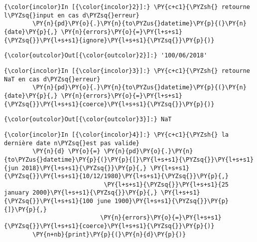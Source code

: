     \begin{Verbatim}[commandchars=\\\{\},frame=single,framerule=0.3mm,rulecolor=\color{cellframecolor}]
{\color{incolor}In [{\color{incolor}2}]:} \PY{c+c1}{\PYZsh{} retourne l\PYZsq{}input en cas d\PYZsq{}erreur}
        \PY{n}{pd}\PY{o}{.}\PY{n}{to\PYZus{}datetime}\PY{p}{(}\PY{n}{date}\PY{p}{,} \PY{n}{errors}\PY{o}{=}\PY{l+s+s1}{\PYZsq{}}\PY{l+s+s1}{ignore}\PY{l+s+s1}{\PYZsq{}}\PY{p}{)}
\end{Verbatim}


\begin{Verbatim}[commandchars=\\\{\},frame=single,framerule=0.3mm,rulecolor=\color{cellframecolor}]
{\color{outcolor}Out[{\color{outcolor}2}]:} '100/06/2018'
\end{Verbatim}
            
    \begin{Verbatim}[commandchars=\\\{\},frame=single,framerule=0.3mm,rulecolor=\color{cellframecolor}]
{\color{incolor}In [{\color{incolor}3}]:} \PY{c+c1}{\PYZsh{} retourne NaT en cas d\PYZsq{}erreur}
        \PY{n}{pd}\PY{o}{.}\PY{n}{to\PYZus{}datetime}\PY{p}{(}\PY{n}{date}\PY{p}{,} \PY{n}{errors}\PY{o}{=}\PY{l+s+s1}{\PYZsq{}}\PY{l+s+s1}{coerce}\PY{l+s+s1}{\PYZsq{}}\PY{p}{)}
\end{Verbatim}


\begin{Verbatim}[commandchars=\\\{\},frame=single,framerule=0.3mm,rulecolor=\color{cellframecolor}]
{\color{outcolor}Out[{\color{outcolor}3}]:} NaT
\end{Verbatim}
            
    \begin{Verbatim}[commandchars=\\\{\},frame=single,framerule=0.3mm,rulecolor=\color{cellframecolor}]
{\color{incolor}In [{\color{incolor}4}]:} \PY{c+c1}{\PYZsh{} la dernière date n\PYZsq{}est pas valide}
        \PY{n}{d} \PY{o}{=} \PY{n}{pd}\PY{o}{.}\PY{n}{to\PYZus{}datetime}\PY{p}{(}\PY{p}{[}\PY{l+s+s1}{\PYZsq{}}\PY{l+s+s1}{jun 2018}\PY{l+s+s1}{\PYZsq{}}\PY{p}{,} \PY{l+s+s1}{\PYZsq{}}\PY{l+s+s1}{10/12/1980}\PY{l+s+s1}{\PYZsq{}}\PY{p}{,}
                            \PY{l+s+s1}{\PYZsq{}}\PY{l+s+s1}{25 january 2000}\PY{l+s+s1}{\PYZsq{}}\PY{p}{,} \PY{l+s+s1}{\PYZsq{}}\PY{l+s+s1}{100 june 1900}\PY{l+s+s1}{\PYZsq{}}\PY{p}{]}\PY{p}{,} 
                           \PY{n}{errors}\PY{o}{=}\PY{l+s+s1}{\PYZsq{}}\PY{l+s+s1}{coerce}\PY{l+s+s1}{\PYZsq{}}\PY{p}{)}
        \PY{n+nb}{print}\PY{p}{(}\PY{n}{d}\PY{p}{)}
\end{Verbatim}


